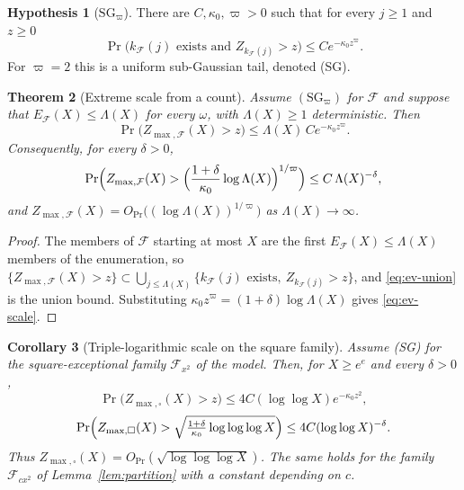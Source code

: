 \documentclass[11pt]{amsart}
\numberwithin{equation}{section}
\theoremstyle{plain}
\newtheorem{theorem}{Theorem}[section]
\newtheorem{corollary}[theorem]{Corollary}
\theoremstyle{definition}
\newtheorem{hypothesis}[theorem]{Hypothesis}
\theoremstyle{remark}
\newcommand{\F}{\mathcal{F}}
\begin{document}
\begin{hypothesis}[$\mathrm{SG}_\varpi$]
\label{hyp:SG}
There are $C,\kappa_0,\varpi>0$ such that for every $j\ge1$ and $z\ge0$
\[
\Pr\bigl(k_\F(j)\text{ exists and }Z_{k_\F(j)}>z\bigr)\le Ce^{-\kappa_0z^\varpi}.
\]
For $\varpi=2$ this is a uniform sub-Gaussian tail, denoted (SG).
\end{hypothesis}

\begin{theorem}[Extreme scale from a count]
\label{thm:ev-union}
Assume $(\mathrm{SG}_\varpi)$ for $\F$ and suppose that $E_\F(X)\le \Lambda(X)$ for
every $\omega$, with $\Lambda(X)\ge1$ deterministic. Then
\begin{equation}
\label{eq:ev-union}
\Pr\bigl(Z_{\max,\F}(X)>z\bigr)\le \Lambda(X)\,Ce^{-\kappa_0z^\varpi}.
\end{equation}
Consequently, for every $\delta>0$,
\begin{equation}
\label{eq:ev-scale}
\Pr\Bigl(Z_{\max,\F}(X)>\Bigl(\frac{1+\delta}{\kappa_0}\log \Lambda(X)\Bigr)^{1/\varpi}\Bigr)
\le C\,\Lambda(X)^{-\delta},
\end{equation}
and $Z_{\max,\F}(X)=O_{\Pr}\bigl((\log \Lambda(X))^{1/\varpi}\bigr)$ as $\Lambda(X)\to\infty$.
\end{theorem}

\begin{proof}
The members of $\F$ starting at most $X$ are the first $E_\F(X)\le \Lambda(X)$
members of the enumeration, so
$\{Z_{\max,\F}(X)>z\}\subset\bigcup_{j\le \Lambda(X)}\{k_\F(j)\text{ exists},\
Z_{k_\F(j)}>z\}$, and \eqref{eq:ev-union} is the union bound. Substituting
$\kappa_0z^\varpi=(1+\delta)\log \Lambda(X)$ gives \eqref{eq:ev-scale}.
\end{proof}

\begin{corollary}[Triple-logarithmic scale on the square family]
\label{cor:ev-square}
Assume (SG) for the square-exceptional family $\F_{x^2}$ of the model. Then,
for $X\ge e^e$ and every $\delta>0$,
\begin{equation}
\label{eq:ev-square}
\Pr\bigl(Z_{\max,\square}(X)>z\bigr)\le4C(\log\log X)e^{-\kappa_0z^2},
\end{equation}
\begin{equation}
\label{eq:ev-square-b}
\Pr\Bigl(Z_{\max,\square}(X)>\sqrt{\tfrac{1+\delta}{\kappa_0}\log\log\log X}\Bigr)
\le4C(\log\log X)^{-\delta}.
\end{equation}
Thus $Z_{\max,\square}(X)=O_{\Pr}(\sqrt{\log\log\log X})$. The same holds for
the family $\F_{cx^2}$ of Lemma~\ref{lem:partition} with a constant depending
on $c$.
\end{corollary}
\end{document}

